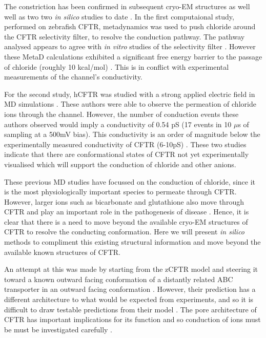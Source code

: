 The constriction has been confirmed in subsequent cryo-EM structures as well well as two two \textit{in silico} studies to date \cite{}. In the first computaional study, performed on zebrafish CFTR, metadynamics was used to push chloride around the CFTR selectivity filter, to resolve the conduction pathway. The pathway analysed appears to agree with \textit{in vitro} studies of the selectivity filter \cite{}. However these MetaD calculations exhibited a significant free energy barrier to the passage of chloride (roughly 10 kcal/mol) \cite{farkas2020}. This is in conflict with experimental measurements of the channel's conductivity. 

For the second study, hCFTR was studied with a strong applied electric field in MD simulations \cite{zeng2021}. These authors were able to observe the permeation of chloride ions through the channel. However, the number of conduction events these authors observed would imply a conductivity of 0.54 pS (17 events in 10 $\mu$s of sampling at a 500mV bias). This conductivity is an order of magnitude below the experimentally measured conductivity of CFTR (6-10pS) \cite{gong2004, lee2007, linsdell2001, sheppard1999}. These two studies indicate that there are conformational states of CFTR not yet experimentally visualised which will support the conduction of chloride and other anions. 

These previous MD studies have focussed on the conduction of chloride, since it is the most physiologically important species to permeate through CFTR. However, larger ions such as bicarbonate and glutathione also move through CFTR and play an important role in the pathogenesis of disease \cite{gao1999, kogan2003, linsdell1998, tang2009, larusch2014, jun2016}. Hence, it is clear that there is a need to move beyond the available cryo-EM structures of CFTR to resolve the conducting conformation. Here we will present \textit{in silico} methods to compliment this existing structural information and move beyond the available known structures of CFTR. 

An attempt at this was made by starting from the zCFTR model and steering it toward a known outward facing conformation of a distantly related ABC transporter in an outward facing conformation \cite{hoffman2018}. However, their prediction has a different architecture to what would be expected from experiments, and so it is difficult to draw testable predictions from their model \cite{hoffman2018, linsdell2018}. The pore architecture of CFTR has important implications for its function and so conduction of ions must be must be investigated carefully \cite{}. 

